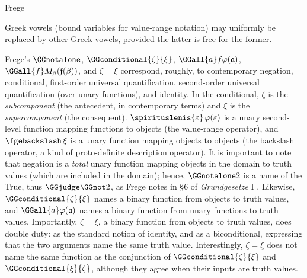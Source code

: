 \begin{entry}{Frege}
\begin{calculus}
\begin{minipage}[t]{.48\textwidth}
Greek vowels (bound variables for value-range notation) may uniformly be replaced by other Greek vowels, provided the latter is free for the former.\\[1ex]
\end{minipage}


\end{calculus}

\begin{clarifications}
Frege's $\GGnotalone$\!, $\GGconditional{\zeta}{\xi}$, $\GGall{a}f\varphi(\mathfrak{a})$, $\GGall{f}M_\beta(\mathfrak{f}(\beta))$, and $\zeta = \xi$ correspond, roughly, to contemporary negation, conditional, first-order universal quantification, second-order universal quantification (over unary functions), and identity. In the conditional, $\zeta$ is the \emph{subcomponent} (the antecedent, in contemporary terms) and $\xi$ is the \emph{supercomponent} (the consequent).
$\spirituslenis{\varepsilon}\,\varphi(\varepsilon)$ is a unary second-level function mapping functions to objects (the value-range operator), and $\fgebackslash\,\xi$ is a unary function mapping objects to objects (the backslash operator, a kind of proto-definite description operator). 
It is important to note that negation is a \emph{total} unary function mapping objects in the domain to truth values (which are included in the domain); hence, $\GGnotalone 2$ is a name of the True, thus $\GGjudge\GGnot 2$, as Frege notes in \S6 of \emph{Grundgesetze} I \cite{Frege1893}. Likewise, $\GGconditional{\zeta}{\xi}$ names a binary function from objects to truth values, and $\GGall{a}\varphi(\mathfrak{a})$ names a binary function from unary functions to truth values.  Importantly, $\zeta = \xi$, a binary function from objects to truth values, does double duty: as the standard notion of identity, and as a biconditional, expressing that the two arguments name the same truth value. Interestingly, $\zeta = \xi$ does not name the same function as the conjunction of $\GGconditional{\zeta}{\xi}$ and $\GGconditional{\xi}{\zeta}$, although they agree when their inputs are truth values.


\end{clarifications}
\end{entry}
